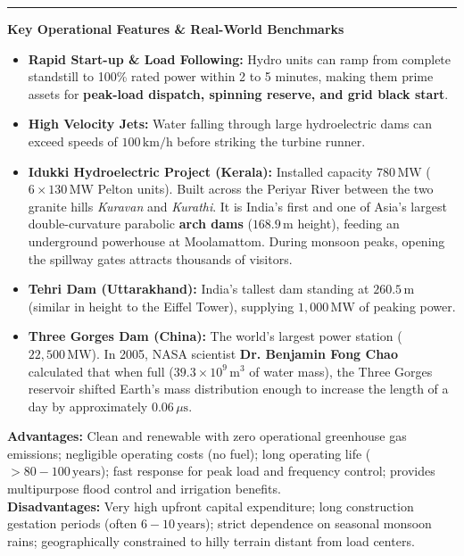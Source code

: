 \documentclass[11pt,a4paper]{article}
\newcommand{\concept}[1]{%
  \vspace{3pt}\noindent\textcolor{AnthGreen}{\rule{3.5pt}{10pt}}\enspace
  \textbf{\sffamily\color{AnthDark}#1}\par\vspace{2pt}%
}
\newenvironment{Note}[1][Note]{\begin{tcolorbox}[notebox, title=#1]}{\end{tcolorbox}}
\begin{document}
\concept{Key Operational Features \& Real-World Benchmarks}
\begin{itemize}
  \item \textbf{Rapid Start-up \& Load Following:} Hydro units can ramp from complete standstill to 100\% rated power within 2 to 5 minutes, making them prime assets for \textbf{peak-load dispatch, spinning reserve, and grid black start}.
  \item \textbf{High Velocity Jets:} Water falling through large hydroelectric dams can exceed speeds of \textbf{$100\,\text{km/h}$} before striking the turbine runner.
  \item \textbf{Idukki Hydroelectric Project (Kerala):} Installed capacity $780\,\text{MW}$ ($6 \times 130\,\text{MW}$ Pelton units). Built across the Periyar River between the two granite hills \emph{Kuravan} and \emph{Kurathi}. It is India's first and one of Asia's largest double-curvature parabolic \textbf{arch dams} ($168.9\,\text{m}$ height), feeding an underground powerhouse at Moolamattom. During monsoon peaks, opening the spillway gates attracts thousands of visitors.
  \item \textbf{Tehri Dam (Uttarakhand):} India's tallest dam standing at $260.5\,\text{m}$ (similar in height to the Eiffel Tower), supplying $1,000\,\text{MW}$ of peaking power.
  \item \textbf{Three Gorges Dam (China):} The world's largest power station ($22,500\,\text{MW}$). In 2005, NASA scientist \textbf{Dr. Benjamin Fong Chao} calculated that when full ($39.3\times 10^9\,\text{m}^3$ of water mass), the Three Gorges reservoir shifted Earth's mass distribution enough to increase the length of a day by approximately \textbf{$0.06\,\mu\text{s}$}.
\end{itemize}

\begin{Note}[Advantages \& Disadvantages of Hydroelectric Power]
\textbf{Advantages:} Clean and renewable with zero operational greenhouse gas emissions; negligible operating costs (no fuel); long operating life ($>80-100\,\text{years}$); fast response for peak load and frequency control; provides multipurpose flood control and irrigation benefits.\\
\textbf{Disadvantages:} Very high upfront capital expenditure; long construction gestation periods (often $6-10\,\text{years}$); strict dependence on seasonal monsoon rains; geographically constrained to hilly terrain distant from load centers.
\end{Note}
\end{document}
